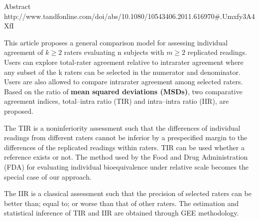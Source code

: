 Abstract
http://www.tandfonline.com/doi/abs/10.1080/10543406.2011.616970#.Umxfy3A4XfI

This article proposes a general comparison model for assessing individual agreement of 
$k  \geq  2$ raters evaluating n subjects with $m  \geq  2$ replicated readings. 
Users can explore total-rater agreement relative to intrarater agreement where any subset of the k raters 
can be selected in the numerator and denominator. Users are also allowed to compare intrarater agreement among 
selected raters. Based on the ratio of \textbf{mean squared deviations (MSDs)}, two comparative agreement indices, 
total–intra ratio (TIR) and intra–intra ratio (IIR), are proposed. 

The TIR is a noninferiority assessment such that the differences of individual readings from different raters cannot be 
inferior by a prespecified margin to the differences of the replicated readings within raters. 
TIR can be used whether a reference exists or not. The method used by the Food and Drug Administration (FDA) 
for evaluating individual bioequivalence under relative scale becomes the special case of our approach. 

The IIR is a classical assessment such that the precision of selected raters can be better than; equal to; or worse than 
that of other raters. The estimation and statistical inference of TIR and IIR are obtained through GEE methodology.

